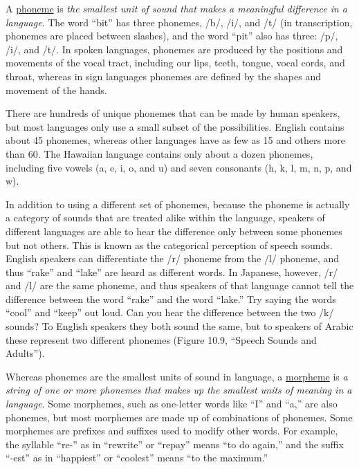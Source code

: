\documentclass[
]{krantz}
\begin{document}
A \protect\hyperlink{phoneme}{phoneme} is \emph{the smallest unit of sound that makes a meaningful difference in a language}. The word ``bit'' has three phonemes, /b/, /i/, and /t/ (in transcription, phonemes are placed between slashes), and the word ``pit'' also has three: /p/, /i/, and /t/. In spoken languages, phonemes are produced by the positions and movements of the vocal tract, including our lips, teeth, tongue, vocal cords, and throat, whereas in sign languages phonemes are defined by the shapes and movement of the hands.

There are hundreds of unique phonemes that can be made by human speakers, but most languages only use a small subset of the possibilities. English contains about 45 phonemes, whereas other languages have as few as 15 and others more than 60. The Hawaiian language contains only about a dozen phonemes, including five vowels (a, e, i, o, and u) and seven consonants (h, k, l, m, n, p, and w).

In addition to using a different set of phonemes, because the phoneme is actually a category of sounds that are treated alike within the language, speakers of different languages are able to hear the difference only between some phonemes but not others. This is known as the categorical perception of speech sounds. English speakers can differentiate the /r/ phoneme from the /l/ phoneme, and thus ``rake'' and ``lake'' are heard as different words. In Japanese, however, /r/ and /l/ are the same phoneme, and thus speakers of that language cannot tell the difference between the word ``rake'' and the word ``lake.'' Try saying the words ``cool'' and ``keep'' out loud. Can you hear the difference between the two /k/ sounds? To English speakers they both sound the same, but to speakers of Arabic these represent two different phonemes (Figure 10.9, ``Speech Sounds and Adults'').

Whereas phonemes are the smallest units of sound in language, a \protect\hyperlink{morpheme}{morpheme} is \emph{a string of one or more phonemes that makes up the smallest units of meaning in a language}. Some morphemes, such as one-letter words like ``I'' and ``a,'' are also phonemes, but most morphemes are made up of combinations of phonemes. Some morphemes are prefixes and suffixes used to modify other words. For example, the syllable ``re-'' as in ``rewrite'' or ``repay'' means ``to do again,'' and the suffix ``-est'' as in ``happiest'' or ``coolest'' means ``to the maximum.''
\end{document}
